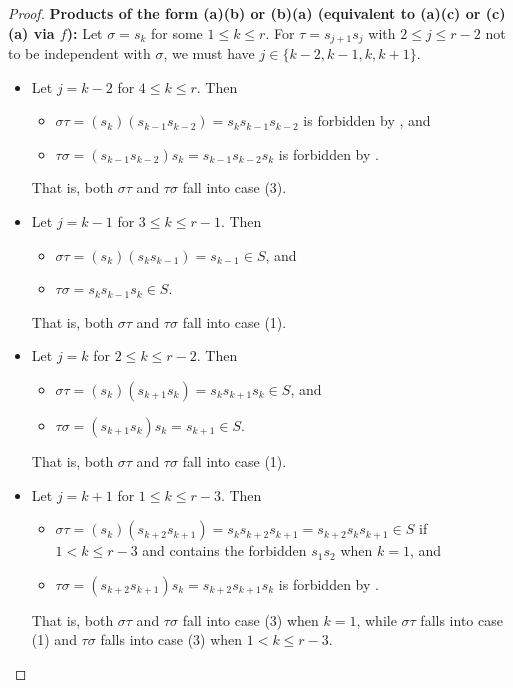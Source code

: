 \documentclass[10pt,a4paper]{amsart}
\begin{document}
\begin{proof}
\noindent \textbf{Products of the form (a)(b) or (b)(a) (equivalent to (a)(c) or (c)(a) via $f$):}
    Let $\sigma = s_k$ for some $1 \leq k \leq r$. For $\tau = s_{j+1}s_{j}$ with $2\leq j\leq r-2$ not to be independent with $\sigma$, we must have $j\in\{k-2,k-1,k,k+1\}$.
    \begin{itemize}
        \item Let $j=k-2$ for $4\leq k\leq r$. Then \begin{itemize}
            \item $\sigma\tau=(s_k)(s_{k-1}s_{k-2})=s_ks_{k-1}s_{k-2}$ is forbidden by , and
            \item $\tau\sigma=(s_{k-1}s_{k-2})s_k=s_{k-1}s_{k-2}s_k$ is forbidden by .
        \end{itemize}
        {That is, both $\sigma\tau$ and $\tau\sigma$ fall into case (3).}
        \item Let $j=k-1$ for $3\leq k\leq r-1$. Then \begin{itemize}
            \item $\sigma\tau=(s_k)(s_k s_{k-1})=s_{k-1}\in S$, and
            \item $\tau\sigma=s_ks_{k-1}s_k\in S$.
        \end{itemize}
        {That is, both $\sigma\tau$ and $\tau\sigma$ fall into case (1).}
        \item Let $j=k$ for $2\leq k\leq r-2$. Then \begin{itemize}
            \item $\sigma\tau=(s_k)(s_{k+1}s_k)=s_k s_{k+1} s_k\in S$, and
            \item $\tau\sigma=(s_{k+1}s_k)s_k=s_{k+1}\in S$.
        \end{itemize} 
        {That is, both $\sigma\tau$ and $\tau\sigma$ fall into case (1).}
        \item Let $j=k+1$ for $1\leq k\leq r-3$. Then\begin{itemize}
            \item $\sigma\tau=(s_k)(s_{k+2}s_{k+1})=s_k s_{k+2}s_{k+1}=s_{k+2}s_k s_{k+1}\in S$ if $1<k\leq r-3$ and contains the forbidden $s_1s_2$ when $k=1$, and
            \item $\tau\sigma=(s_{k+2}s_{k+1})s_k=s_{k+2}s_{k+1}s_k$ is forbidden by .
        \end{itemize}
        That is, both $\sigma\tau$ and $\tau\sigma$ fall into case (3) when $k=1$, while $\sigma\tau$ falls into case (1) and $\tau\sigma$ falls into case (3) when $1<k\le r-3$.
    \end{itemize}


\end{proof}
\end{document}
